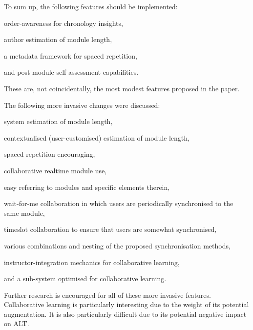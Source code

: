 \documentclass{article}
\begin{document}
\begin{multicols}{2}
To sum up, the following features should be implemented:
\begin{itemize*}
  \item order-awareness for chronology insights,
  \item author estimation of module length,
  \item a metadata framework for spaced repetition,
  \item and post-module self-assessment capabilities.
\end{itemize*}

These are, not coincidentally, the most modest features proposed in the paper.

The following more invasive changes were discussed:

\begin{itemize*}
  \item system estimation of module length,
  \item contextualised (user-customised) estimation of module length,
  \item spaced-repetition encouraging,
  \item collaborative realtime module use,
  \item easy referring to modules and specific elements therein,
  \item wait-for-me collaboration in which users are periodically synchronised 
  to the same module,
  \item timeslot collaboration to ensure that users are somewhat synchronised,
  \item various combinations and nesting of the proposed synchronisation 
  methods,
  \item instructor-integration mechanics for collaborative learning,
  \item and a sub-system optimised for collaborative learning.
\end{itemize*}

Further research is encouraged for all of these more invasive features. 
Collaborative learning is particularly interesting due to the weight of its 
potential augmentation. It is also particularly difficult due to its potential 
negative impact on ALT.
  \end{multicols}


\newpage
\end{document}
